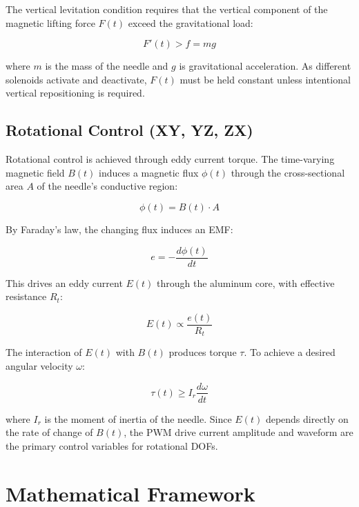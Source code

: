 \documentclass[12pt, a4paper]{article}
\begin{document}
The vertical levitation condition requires that the vertical component
of the magnetic lifting force $F(t)$ exceed the gravitational load:

\begin{equation}
F'(t) > f = mg
\end{equation}

where $m$ is the mass of the needle and $g$ is gravitational acceleration.
As different solenoids activate and deactivate, $F(t)$ must be held
constant unless intentional vertical repositioning is required.

\subsection{Rotational Control (XY, YZ, ZX)}
Rotational control is achieved through eddy current torque. The
time-varying magnetic field $B(t)$ induces a magnetic flux $\phi(t)$
through the cross-sectional area $A$ of the needle's conductive region:

\begin{equation}
\phi(t) = B(t) \cdot A
\end{equation}

By Faraday's law, the changing flux induces an EMF:

\begin{equation}
e = -\frac{d\phi(t)}{dt}
\end{equation}

This drives an eddy current $E(t)$ through the aluminum core, with
effective resistance $R_t$:

\begin{equation}
E(t) \propto \frac{e(t)}{R_t}
\end{equation}

The interaction of $E(t)$ with $B(t)$ produces torque $\tau$. To achieve
a desired angular velocity $\omega$:

\begin{equation}
\tau(t) \geq I_r \frac{d\omega}{dt}
\end{equation}

where $I_r$ is the moment of inertia of the needle. Since $E(t)$ depends
directly on the rate of change of $B(t)$, the PWM drive current amplitude
and waveform are the primary control variables for rotational DOFs.

\section{Mathematical Framework}
\end{document}
